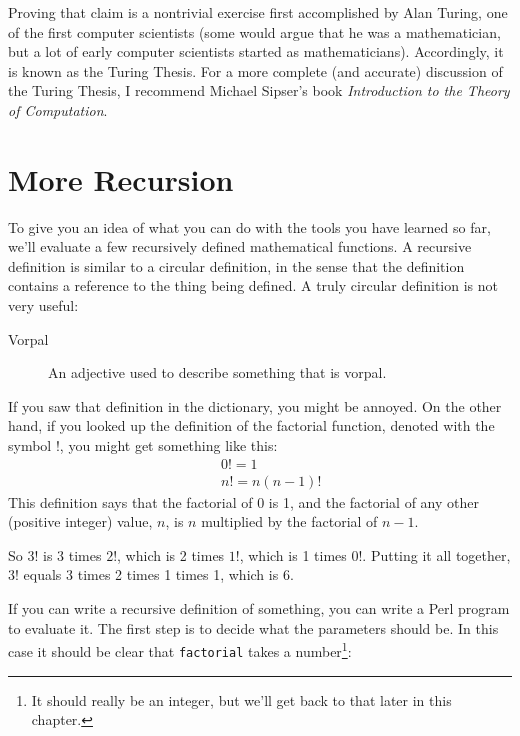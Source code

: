 Proving that claim is a nontrivial exercise first accomplished by Alan
Turing, one of the first computer scientists (some would argue that he
was a mathematician, but a lot of early computer scientists started as
mathematicians).  Accordingly, it is known as the Turing Thesis.
For a more complete (and accurate) discussion of the Turing Thesis,
I recommend Michael Sipser's book {\em Introduction to the
Theory of Computation}.

\section{More Recursion}
\label{more.recursion}


To give you an idea of what you can do with the tools you have learned
so far, we'll evaluate a few recursively defined mathematical
functions.  A recursive definition is similar to a circular
definition, in the sense that the definition contains a reference to
the thing being defined.  A truly circular definition is not very
useful:

\begin{description}

\item[Vorpal] An adjective used to describe something that is vorpal.

\end{description}

If you saw that definition in the dictionary, you might be annoyed. On
the other hand, if you looked up the definition of the factorial
function, denoted with the symbol $!$, you might get something like
this:
%
\begin{eqnarray*}
&&  0! = 1 \\
&&  n! = n (n-1)!
\end{eqnarray*}
%
This definition says that the factorial of 0 is 1, and the 
factorial of any other (positive integer) value, $n$, is 
$n$ multiplied by the factorial of $n-1$.

So $3!$ is 3 times $2!$, which is 2 times $1!$, which is 1 times
$0!$. Putting it all together, $3!$ equals 3 times 2 times 1 times 1,
which is 6.

If you can write a recursive definition of something, you can
write a Perl program to evaluate it. The first step is to decide
what the parameters should be.  In this case it should be clear
that {\tt factorial} takes a number\footnote{It should really be an 
integer, but we'll get back to that later in this chapter.}:

